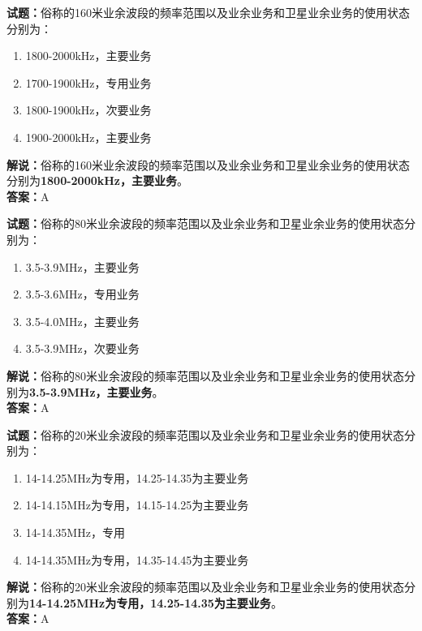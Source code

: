 \documentclass{ctexbook}
\begin{document}
\bigskip

\noindent\textbf{试题：}俗称的160米业余波段的频率范围以及业余业务和卫星业余业务的使用状态分别为：
\begin{enumerate}[leftmargin=3em]
  \item 1800-2000\unit{\kHz}，主要业务
  \item 1700-1900\unit{\kHz}，专用业务
  \item 1800-1900\unit{\kHz}，次要业务
  \item 1900-2000\unit{\kHz}，主要业务
\end{enumerate}
\noindent\textbf{解说：}俗称的160米业余波段的频率范围以及业余业务和卫星业余业务的使用状态分别为\textbf{1800-2000\unit{\kHz}，主要业务}。\\\noindent\textbf{答案：}A

\bigskip

\noindent\textbf{试题：}俗称的80米业余波段的频率范围以及业余业务和卫星业余业务的使用状态分别为：
\begin{enumerate}[leftmargin=3em]
  \item 3.5-3.9\unit{\MHz}，主要业务
  \item 3.5-3.6\unit{\MHz}，专用业务
  \item 3.5-4.0\unit{\MHz}，主要业务
  \item 3.5-3.9\unit{\MHz}，次要业务
\end{enumerate}
\noindent\textbf{解说：}俗称的80米业余波段的频率范围以及业余业务和卫星业余业务的使用状态分别为\textbf{3.5-3.9\unit{\MHz}，主要业务}。\\\noindent\textbf{答案：}A

\bigskip

\noindent\textbf{试题：}俗称的20米业余波段的频率范围以及业余业务和卫星业余业务的使用状态分别为：
\begin{enumerate}[leftmargin=3em]
  \item 14-14.25\unit{\MHz}为专用，14.25-14.35为主要业务
  \item 14-14.15\unit{\MHz}为专用，14.15-14.25为主要业务
  \item 14-14.35\unit{\MHz}，专用
  \item 14-14.35\unit{\MHz}为专用，14.35-14.45为主要业务
\end{enumerate}
\noindent\textbf{解说：}俗称的20米业余波段的频率范围以及业余业务和卫星业余业务的使用状态分别为\textbf{14-14.25\unit{\MHz}为专用，14.25-14.35为主要业务}。\\\noindent\textbf{答案：}A

\bigskip
\end{document}
